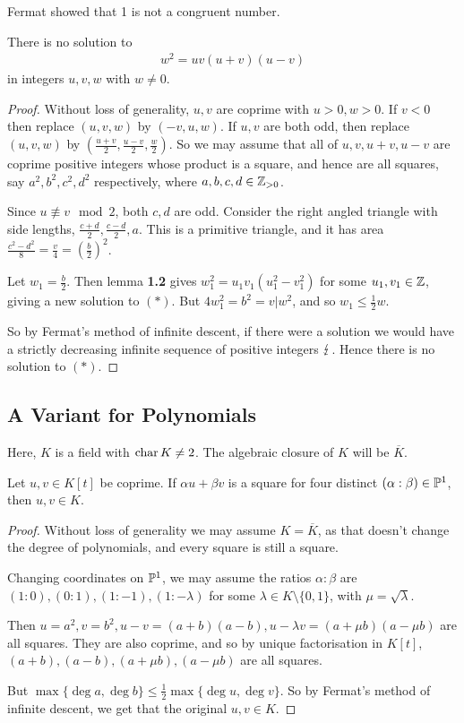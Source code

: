 \documentclass[10pt,a4paper]{article}
\begin{document}
Fermat showed that 1 is not a congruent number.
\begin{theorem}
  There is no solution to
  \begin{align*}
    w^2 = uv(u+v)(u-v)\tag{$\ast$}
  \end{align*} in integers $u,v,w$ with $w \neq 0$.
\end{theorem}
\begin{proof}
  Without loss of generality, $u,v$ are coprime with $u > 0, w> 0$. If $v < 0$ then replace $(u,v,w)$ by $(-v, u, w)$. If $u, v$ are both odd, then replace $(u,v,w)$ by $(\frac{u+v}{2}, \frac{u-v}{2}, \frac{w}{2})$. So we may assume that all of $u, v, u+v, u-v$ are coprime positive integers whose product is a square, and hence are all squares, say $a^2, b^2, c^2, d^2$ respectively, where $a,b,c,d \in \Z_{>0}$.

  Since $u \nequiv v \mod 2$, both $c, d$ are odd. Consider the right angled triangle with side lengths, $\frac{c+d}{2}, \frac{c-d}{2}, a$. This is a primitive triangle, and it has area $\frac{c^2-d^2}{8} = \frac{v}{4} = (\frac{b}{2})^2$.

  Let $w_1 = \frac{b}{2}$. Then lemma \textbf{1.2} gives $w_1^2 = u_1v_1(u_1^2-v_1^2)$ for some $u_1, v_1 \in \Z$, giving a new solution to $(\ast)$. But $4w_1^2 = b^2 = v | w^2$, and so $w_1 \leq \frac12 w$.

  So by Fermat's method of infinite descent, if there were a solution we would have a strictly decreasing infinite sequence of positive integers $\contr$. Hence there is no solution to $(\ast)$.
\end{proof}

\subsection{A Variant for Polynomials}
Here, $K$ is a field with $\charr K \neq 2$. The algebraic closure of $K$ will be $\overline{K}$.
\begin{lemma}
  Let $u, v \in K[t]$ be coprime. If $\alpha u + \beta v$ is a square for four distinct $(\alpha :\beta) \in \P^1$, then $u, v \in K$.
\end{lemma}
\begin{proof}
  Without loss of generality we may assume $K = \overline{K}$, as that doesn't change the degree of polynomials, and every square is still a square.

  Changing coordinates on $\P^1$, we may assume the ratios $\alpha:\beta$ are $(1:0), (0:1), (1:-1), (1:-\lambda)$ for some $\lambda \in K\setminus\{0, 1\}$, with $\mu = \sqrt{\lambda}$.

  Then $u = a^2, v = b^2, u-v = (a+b)(a-b), u-\lambda v = (a+\mu b)(a-\mu b)$ are all squares. They are also coprime, and so by unique factorisation in $K[t]$, $(a+b), (a-b), (a+\mu b), (a-\mu b)$ are all squares.

  But $\max \{\deg a, \deg b\} \leq \frac12 \max \{\deg u, \deg v\}$. So by Fermat's method of infinite descent, we get that the original $u,v \in K$.
\end{proof}
\end{document}
